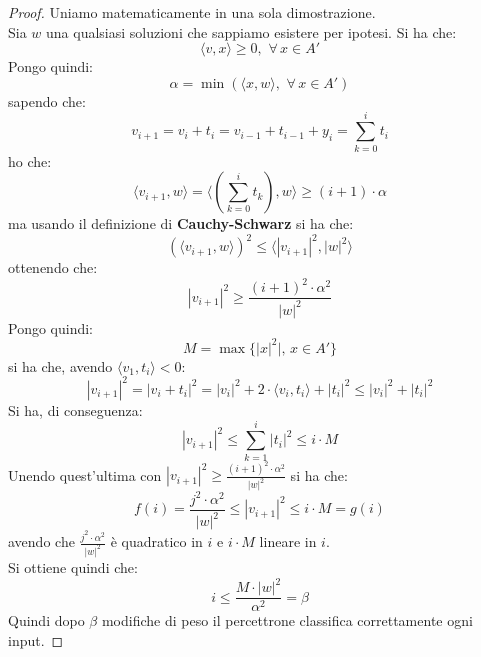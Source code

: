 		\begin{proof}
			Uniamo matematicamente in una sola dimostrazione.\\
			Sia $w$ una qualsiasi soluzioni che sappiamo esistere per ipotesi. Si ha che:
			\[\langle v, x\rangle\geq 0,\,\,\forall\, x\in A'\]
			Pongo quindi:
			\[\alpha=\min(\langle x, w\rangle,\,\,\forall\, x\in A')\]
			sapendo che:
			\[v_{i+1}=v_i+t_i=v_{i-1}+t_{i-1}+y_i=\sum_{k=0}^it_i\]
			ho che:
			\[\langle v_{i+1}, w\rangle=\langle \left(\sum_{k=0}^i t_k \right),
				w\rangle\geq (i+1)\cdot\alpha\]
				ma usando il definizione di \textbf{Cauchy-Schwarz} si ha che:
				\[(\langle v_{i+1}, w\rangle)^2\leq \langle |v_{i+1}|^2,|w|^2\rangle\]
				ottenendo che:
				\[|v_{i+1}|^2\geq \frac{(i+1)^2\cdot \alpha^2}{|w|^2}\]
				Pongo quindi:
				\[M=\max\{|x|^2|,\, x\in A'\}\]
				si ha che, avendo $\langle v_{1}, t_i\rangle<0$:
				\[|v_{i+1}|^2=|v_i+t_i|^2=|v_i|^2+2\cdot\langle v_{i}, t_i\rangle+|t_i|^2\leq
					|v_i|^2+|t_i|^2\]
					Si ha, di conseguenza:
					\[|v_{i+1}|^2\leq \sum_{k=1}^i |t_i|^2\leq i\cdot M\]
					Unendo quest'ultima con $|v_{i+1}|^2\geq \frac{(i+1)^2\cdot \alpha^2}{|w|^2}$
					si ha che:
					\[f(i)=\frac{j^2\cdot \alpha^2}{|w|^2}\leq |v_{i+1}|^2\leq i\cdot M=g(i)\]
					avendo che $\frac{j^2\cdot \alpha^2}{|w|^2}$ è quadratico in $i$ e $ i\cdot M$
					lineare in $i$.\\
					Si ottiene quindi che:
					\[i\leq\frac{M\cdot |w|^2}{\alpha^2}=\beta\]
					Quindi dopo $\beta$ modifiche di peso il percettrone classifica correttamente
					ogni input.
					\end{proof}
